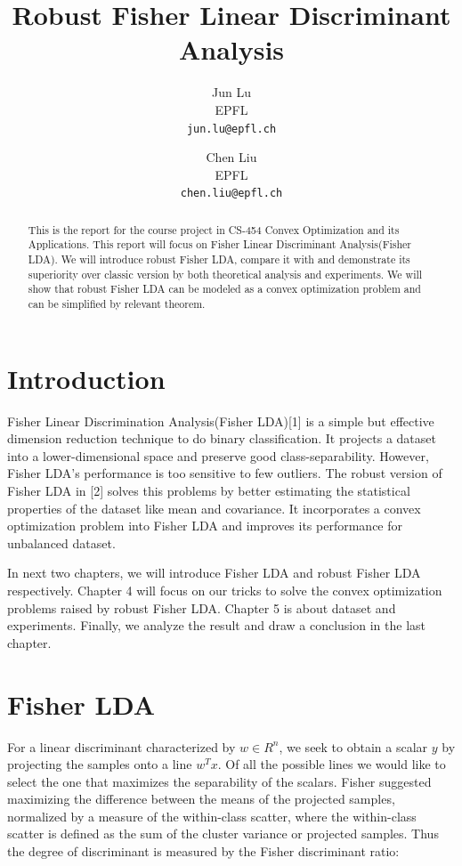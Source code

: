 \documentclass{article} %
\title{Robust Fisher Linear Discriminant Analysis}
\author{
Jun Lu\\
EPFL \\
\texttt{jun.lu@epfl.ch} \\
\and
Chen Liu \\
EPFL \\
\texttt{chen.liu@epfl.ch} \\
}
\begin{document}
\maketitle

\begin{abstract}
This is the report for the course project in CS-454 Convex Optimization and its Applications. This report will focus on Fisher Linear Discriminant Analysis(Fisher LDA). We will introduce robust Fisher LDA, compare it with and demonstrate its superiority over classic version by both theoretical analysis and experiments. We will show that robust Fisher LDA can be modeled as a convex optimization problem and can be simplified by relevant theorem.
\end{abstract}

\section{Introduction}
Fisher Linear Discrimination Analysis(Fisher LDA)[1] is a simple but effective dimension reduction technique to do binary classification. It projects a dataset into a lower-dimensional space and preserve good class-separability. However, Fisher LDA's performance is too sensitive to few outliers. The robust version of Fisher LDA in [2] solves this problems by better estimating the statistical properties of the dataset like mean and covariance. It incorporates a convex optimization problem into Fisher LDA and improves its performance for unbalanced dataset.

In next two chapters, we will introduce Fisher LDA and robust Fisher LDA respectively. Chapter 4 will focus on our tricks to solve the convex optimization problems raised by robust Fisher LDA. Chapter 5 is about dataset and experiments. Finally, we analyze the result and draw a conclusion in the last chapter.

\section{Fisher LDA}
For a linear discriminant characterized by $w \in R^n$, we seek to obtain a scalar $y$ by projecting the samples onto a line $w^Tx$. Of all the possible lines we would like to select the one that maximizes the separability of the scalars. Fisher suggested maximizing the difference between the means of the projected samples, normalized by a measure of the within-class scatter, where the within-class scatter is defined as the sum of the cluster variance or projected samples. Thus the degree of discriminant is measured by the Fisher discriminant ratio:
\end{document}
